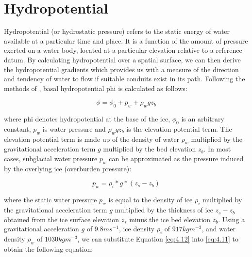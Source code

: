 
\section{Hydropotential} \label{sec:hydropotential}


Hydropotential (or hydrostatic pressure) refers to the static energy of water available at a particular time and place.
It is a function of the amount of pressure exerted on a water body, located at a particular elevation relative to a reference datum.
By calculating hydropotential over a spatial surface, we can then derive the hydropotential gradients which provides us with a measure of the direction and tendency of water to flow if suitable conduits exist in its path.
Following the methods of \citet{ShreveMovementWaterGlaciers1972}, basal hydropotential \gls{phi} is calculated as follows:

\begin{equation}\label{eq:4.11}
  \phi = \phi_0 + p_w + \rho_wgz_b
\end{equation}

where \gls{phi} denotes hydropotential at the base of the ice, $\phi_0$ is an arbitrary constant, $p_w$ is water pressure and $\rho_wgz_b$ is the elevation potential term.
The elevation potential term is made up of the density of water $\rho_w$ multiplied by the gravitational acceleration term $g$ multiplied by the bed elevation $z_b$.
In most cases, subglacial water pressure $p_w$ can be approximated as the pressure induced by the overlying ice (overburden pressure):

\begin{equation}\label{eq:4.12}
  p_w = \rho_i * g * (z_s - z_b)
\end{equation}

where the static water pressure $p_w$ is equal to the density of ice $\rho_i$ multiplied by the gravitational acceleration term $g$ multiplied by the thickness of ice $z_s - z_b$ obtained from the ice surface elevation $z_s$ minus the ice bed elevation $z_b$.
Using a gravitational acceleration $g$ of $9.8ms^{-1}$, ice density $\rho_i$ of $917kgm^{-3}$, and water density $\rho_w$ of $1030kgm^{-3}$, we can substitute Equation \eqref{eq:4.12} into \eqref{eq:4.11} to obtain the following equation:

